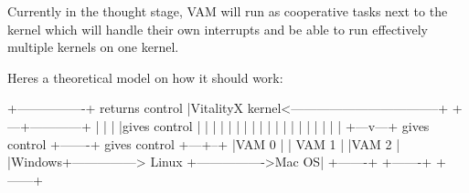 Currently in the thought stage, V\+AM will run as cooperative tasks next to the kernel which will handle their own interrupts and be able to run effectively multiple kernels on one kernel.

Heres a theoretical model on how it should work\+:


\begin{DoxyCode}
+----------------+       returns control
|VitalityX kernel<-----------------------------------+
+---+------------+                                   |
    |                                                |
    |gives control                                   |
    |                                                |
    |                                                |
    |                                                |
    |                                                |
    |                                                |
    |                                                |
    |                                                |
    |                                                |
    |                                                |
+---v---+ gives control +-------+  gives control +---+--+
|VAM 0  |               | VAM 1 |                |VAM 2 |
|Windows+---------------> Linux +---------------->Mac OS|
+-------+               +-------+                +------+
\end{DoxyCode}
 